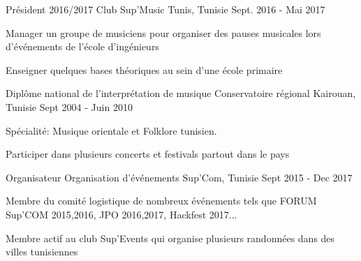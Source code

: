 

\begin{cventries}

  \cventry
    {Président 2016/2017} %
    {Club Sup'Music} %
    {Tunis, Tunisie } %
    {Sept. 2016 - Mai 2017} %
    {
      \begin{cvitems} %
        \item {Manager un groupe de musiciens pour organiser des pauses musicales lors d'événements de l'école d'ingénieurs}
        \item {Enseigner quelques bases théoriques au sein d'une école primaire }
      \end{cvitems}
    }

  \cventry
    {Diplôme national de l'interprétation de musique} %
    {Conservatoire régional} %
    {Kairouan, Tunisie} %
    {Sept 2004 - Juin 2010} %
    {
      \begin{cvitems} %
        \item {Spécialité: Musique orientale et Folklore tunisien.}
        \item {Participer dans plusieurs concerts et festivals partout dans le pays}
      \end{cvitems}
    }

 \cventry
    {Organisateur} %
    {Organisation d'événements} %
    {Sup'Com, Tunisie} %
    {Sept 2015 - Dec 2017} %
    {
      \begin{cvitems} %
        \item {Membre du comité logistique de nombreux événements tels que FORUM Sup'COM 2015,2016, JPO 2016,2017, Hackfest 2017... }
        \item {Membre actif au club Sup'Events qui organise plusieurs randonnées dans des villes tunisiennes}
      \end{cvitems}
    }

\end{cventries}
